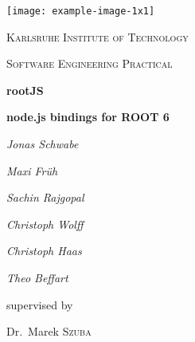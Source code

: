 \begin{titlepage}
	\centering
	\texttt{[image: example-image-1x1]}\par\vspace{1cm}
	{\scshape\LARGE Karlsruhe Institute of Technology \par}
	\vspace{1cm}
	{\scshape\Large Software Engineering Practical\par}
	\vspace{1.5cm}
	{\Huge\bfseries rootJS\par}
	\vspace{0.25cm}
	{\Large\bfseries node.js bindings for ROOT 6\par}
	\vspace{2cm}
	{\Large\itshape Jonas Schwabe\par}
	{\Large\itshape Maxi Fr\"uh\par}
	{\Large\itshape Sachin Rajgopal\par}
	{\Large\itshape Christoph Wolff\par}
	{\Large\itshape Christoph Haas\par}
	{\Large\itshape Theo Beffart\par}
	\vfill
	supervised by\par
	Dr.~Marek \textsc{Szuba}
	
	\vfill
	
	{\large \date{30.11.2015}\par}
\end{titlepage}